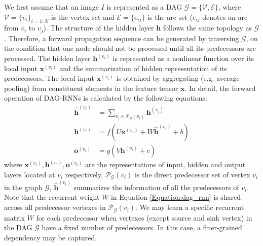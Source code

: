 \documentclass[10pt,twocolumn,letterpaper]{article}
\newcommand \hh {\mathbf{h}}
\newcommand \oo {\mathbf{o}}
\newcommand \xx {\mathbf{x}}
\begin{document}
We first assume that an image $I$ is represented as a DAG $\mathcal{G} = \{\mathcal{V}, \mathcal{E} \}$, where $\mathcal{V} = \{v_i\}_{i=1:N}$ is the vertex set and $\mathcal{E} = \{e_{ij}\}$ is the arc set ($e_{ij}$ denotes an arc from $v_i$ to $v_j$). The structure of the hidden layer $\hh$ follows the same topology as $\mathcal{G}$. Therefore, a forward propagation sequence can be generated by traversing $\mathcal{G}$, on the condition that one node should not be processed until all its predecessors are processed.
The hidden layer $\hh^{(v_i)}$ is represented as a nonlinear function over its local input $\xx^{(v_i)}$ and the summarization of hidden representation of its predecessors. The local input $\xx^{(v_i)}$ is obtained by aggregating (e.g. average pooling) from constituent elements in the feature tensor $\xx$.
In detail, the forward operation of DAG-RNNs is calculated by the following equations:
\begin{equation}
\begin{aligned}
\hat{\hh}^{(v_i)} & = \!\!\!\!\! \sum_{v_j \in \mathcal{P}_{\mathcal{G}}(v_i)} \!\!\!\!\!\hh^{(v_j)} \\
\hh^{(v_i)} & = f(U\xx^{(v_i)} + W\hat{\hh}^{(v_i)} + b) \\
\oo^{(v_i)} & = g(V\hh^{(v_i)} + c)
\end{aligned}
\label{Equation:dag_rnn}
\end{equation}
where $\xx^{(v_i)}, \hh^{(v_i)}, \oo^{(v_i)}$ are the representations of input, hidden and output layers located at $v_i$ respectively, $\mathcal{P}_{\mathcal{G}}(v_i)$ is the direct predecessor set of vertex $v_i$ in the graph $\mathcal{G}$,
$\hat{\hh}^{(v_i)}$ summarizes the information of all the predecessors of $v_i$.
 Note that the recurrent weight $W$ in Equation \ref{Equation:dag_rnn} is shared across all predecessor vertexes in $\mathcal{P}_{\mathcal{G}}(v_i)$. We may learn a specific recurrent matrix $W$ for each predecessor when vertexes (except source and sink vertex) in the DAG $\mathcal{G}$ have a fixed number of predecessors.
In this case,  a finer-grained dependency may be captured.
\end{document}
